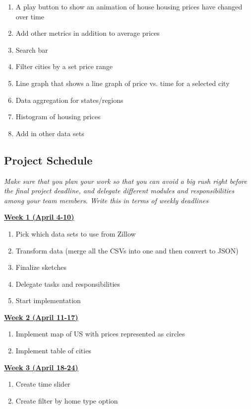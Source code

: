 \documentclass[12pt]{article}
\begin{document}
\begin{enumerate}
\item A play button to show an animation of house housing prices have changed over time
\item Add other metrics in addition to average prices
\item Search bar
\item Filter cities by a set price range
\item Line graph that shows a line graph of price vs. time for a selected city
\item Data aggregation for states/regions
\item Histogram of housing prices
\item Add in other data sets
\end{enumerate}

\subsection*{Project Schedule}
\vspace{-3mm}
{\it Make sure that you plan your work so that you can avoid a big rush right before the final project deadline, and delegate different modules and responsibilities among your team members. Write this in terms of weekly deadlines}

\underline{\textbf{Week 1 (April 4-10)}}
\begin{enumerate}
\item Pick which data sets to use from Zillow
\item Transform data (merge all the CSVs into one and then convert to JSON)
\item Finalize sketches
\item Delegate tasks and responsibilities
\item Start implementation 
\end{enumerate}

\underline{\textbf{Week 2 (April 11-17)}}
\begin{enumerate}
\item Implement map of US with prices represented as circles
\item Implement table of cities
\end{enumerate}

\underline{\textbf{Week 3 (April 18-24)}}
\begin{enumerate}
\item Create time slider
\item Create filter by home type option
\end{enumerate}
\end{document}
